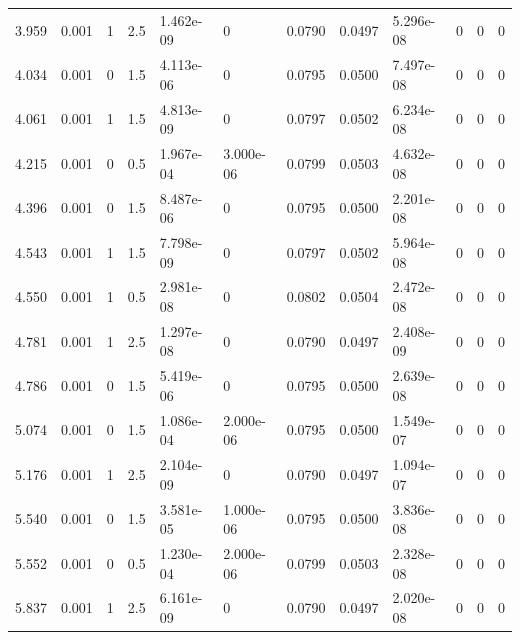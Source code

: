 \documentclass[preview]{standalone}
\begin{document}
{{\begin{tabular}{L{1.2cm}C{1.2cm} C{0.3cm}C{0.5cm} C{1.4cm}C{1.4cm} C{1.4cm}C{1.4cm} C{1.6cm}C{1.6cm} C{1.6cm}C{1.6cm}}
  3.959  &  0.001  & 1     & 2.5 &  1.462e-09  & 0  &  0.0790&   0.0497& 5.296e-08 & 0   &  0 & 0  \\ 
  4.034  &  0.001  & 0     & 1.5 &  4.113e-06  & 0  &  0.0795&   0.0500& 7.497e-08 & 0   &  0 & 0  \\ 
  4.061  &  0.001  & 1     & 1.5 &  4.813e-09  & 0  &  0.0797&   0.0502& 6.234e-08 & 0   &  0 & 0  \\ 
  4.215  &  0.001  & 0     & 0.5 &  1.967e-04  & 3.000e-06  &  0.0799&   0.0503& 4.632e-08 & 0   &  0 & 0  \\ 
  4.396  &  0.001  & 0     & 1.5 &  8.487e-06  & 0  &  0.0795&   0.0500& 2.201e-08 & 0   &  0 & 0  \\ 
  4.543  &  0.001  & 1     & 1.5 &  7.798e-09  & 0  &  0.0797&   0.0502& 5.964e-08 & 0   &  0 & 0  \\ 
  4.550  &  0.001  & 1     & 0.5 &  2.981e-08  & 0  &  0.0802&   0.0504& 2.472e-08 & 0   &  0 & 0  \\ 
  4.781  &  0.001  & 1     & 2.5 &  1.297e-08  & 0  &  0.0790&   0.0497& 2.408e-09 & 0   &  0 & 0  \\ 
  4.786  &  0.001  & 0     & 1.5 &  5.419e-06  & 0  &  0.0795&   0.0500& 2.639e-08 & 0   &  0 & 0  \\ 
  5.074  &  0.001  & 0     & 1.5 &  1.086e-04  & 2.000e-06  &  0.0795&   0.0500& 1.549e-07 & 0   &  0 & 0  \\ 
  5.176  &  0.001  & 1     & 2.5 &  2.104e-09  & 0  &  0.0790&   0.0497& 1.094e-07 & 0   &  0 & 0  \\ 
  5.540  &  0.001  & 0     & 1.5 &  3.581e-05  & 1.000e-06  &  0.0795&   0.0500& 3.836e-08 & 0   &  0 & 0  \\ 
  5.552  &  0.001  & 0     & 0.5 &  1.230e-04  & 2.000e-06  &  0.0799&   0.0503& 2.328e-08 & 0   &  0 & 0  \\ 
  5.837  &  0.001  & 1     & 2.5 &  6.161e-09  & 0  &  0.0790&   0.0497& 2.020e-08 & 0   &  0 & 0  \\ 
\hline 
\end{tabular} 

}}
\end{document}
